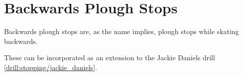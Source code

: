 \section{Backwards Plough Stops}
\label{sec:stopping/backwards_plough}

Backwards plough stops are, as the name implies, plough stops while skating backwards.

These can be incorporated as an extension to the Jackie Daniels drill \ref{drill:stopping/jackie_daniels}.
